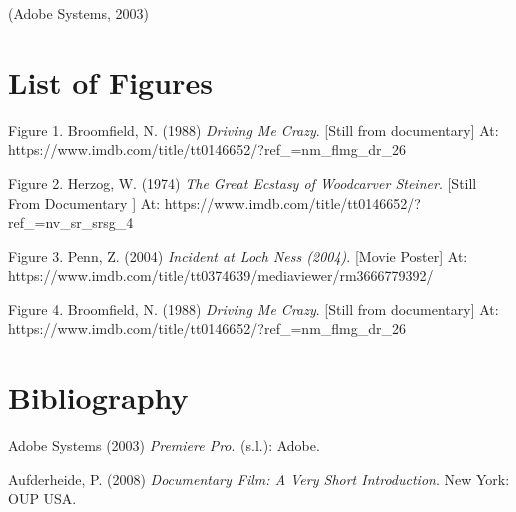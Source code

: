 \documentclass[
  12pt,
]{book}
\newlength{\cslhangindent}
\newlength{\cslentryspacingunit} %
\newenvironment{CSLReferences}[2] %
 {%
  \setlength{\parindent}{0pt}
  \ifodd #1
  \let\oldpar\par
  \def\par{\hangindent=\cslhangindent\oldpar}
  \fi
  \setlength{\parskip}{#2\cslentryspacingunit}
 }%
 {}
\begin{document}
(Adobe Systems, 2003)

\pagebreak

\hypertarget{List of Figures}{%
\chapter*{List of Figures}\label{List of Figures}}

Figure 1. Broomfield, N. (1988) \emph{Driving Me Crazy}. {[}Still from documentary{]} At: https://www.imdb.com/title/tt0146652/?ref\_=nm\_flmg\_dr\_26

Figure 2. Herzog, W. (1974) \emph{The Great Ecstasy of Woodcarver Steiner}. {[}Still From Documentary {]} At: https://www.imdb.com/title/tt0146652/?ref\_=nv\_sr\_srsg\_4

Figure 3. Penn, Z. (2004) \emph{Incident at Loch Ness (2004)}. {[}Movie Poster{]} At: https://www.imdb.com/title/tt0374639/mediaviewer/rm3666779392/

Figure 4. Broomfield, N. (1988) \emph{Driving Me Crazy}. {[}Still from documentary{]} At: https://www.imdb.com/title/tt0146652/?ref\_=nm\_flmg\_dr\_26

\hypertarget{bibliography}{%
\chapter*{Bibliography}\label{bibliography}}

\hypertarget{refs}{}
\begin{CSLReferences}{0}{0}
\leavevmode{}%
Adobe Systems (2003) \emph{Premiere Pro}. (s.l.): Adobe.

\leavevmode{}%
Aufderheide, P. (2008) \emph{Documentary Film: A Very Short Introduction}. New York: OUP USA.

\end{CSLReferences}

\backmatter
\end{document}
